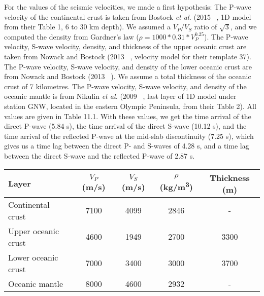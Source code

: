 \documentclass[main.tex]{subfiles}
\begin{document}
For the values of the seismic velocities, we made a first hypothesis: The P-wave velocity of the continental crust is taken from Bostock \textit{et al.} (2015 ~\cite{BOS_2015}, 1D model from their Table 1, 6 to 30 km depth). We assumed a $V_P / V_S$ ratio of $\sqrt{3}$, and we computed the density from Gardner's law ($\rho = 1000 * 0.31 * V_P^{0.25}$). The P-wave velocity, S-wave velocity, density, and thickness of the upper oceanic crust are taken from Nowack and Bostock (2013 ~\cite{NOW_2013}, velocity model for their template 37). The P-wave velocity, S-wave velocity, and density of the lower oceanic crust are from Nowack and Bostock (2013 ~\cite{NOW_2013}). We assume a total thickness of the oceanic crust of 7 kilometres. The P-wave velocity, S-wave velocity, and density of the oceanic mantle is from Nikulin \textit{et al.} (2009 ~\cite{NIK_2009}, last layer of 1D model under station GNW, located in the eastern Olympic Peninsula, from their Table 2). All values are given in Table 11.1. With these values, we get the time arrival of the direct P-wave (5.84 s), the time arrival of the direct S-wave (10.12 s), and the time arrival of the reflected P-wave at the mid-slab discontinuity (7.25 s), which gives us a time lag between the direct P- and S-waves of 4.28 s, and a time lag between the direct S-wave and the reflected P-wave of 2.87 s. \\

\begin{center}
\begin{tabular}{| l | c | c | c | c |}
  \hline
  Layer & $V_P$ (m/s) & $V_S$ (m/s) & $\rho$ (kg/m\textsuperscript{3}) & Thickness (m) \\
  \hline
  Continental crust & 7100 & 4099 & 2846 & - \\
  Upper oceanic crust & 4600 & 1949 & 2700 & 3300 \\
  Lower oceanic crust & 7000 & 3400 & 3000 & 3700 \\
  Oceanic mantle & 8000 & 4600 & 2932 & - \\
  \hline
\end{tabular}
\captionsetup{type=table}
\end{center}
\end{document}
